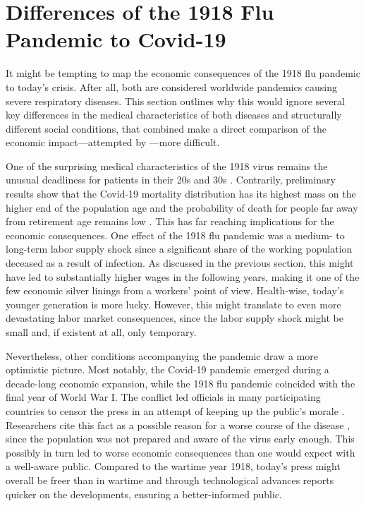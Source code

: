 \documentclass[12pt,a4paper]{article}
\begin{document}
\section{Differences of the 1918 Flu Pandemic to Covid-19}

It might be tempting to map the economic consequences of the 1918 flu pandemic to today's crisis.
After all, both are considered worldwide pandemics causing severe respiratory diseases.
This section outlines why this would ignore several key differences in the medical characteristics of both diseases and structurally different social conditions, that combined make a direct comparison of the economic impact---attempted by \cite{barroCoronavirusGreatInfluenza2020}---more difficult.

One of the surprising medical characteristics of the 1918 virus remains the unusual deadliness for patients in their 20s and 30s \citep{taubenberger1918InfluenzaMother2006}.
Contrarily, preliminary results show that the Covid-19 mortality distribution has its highest mass on the higher end of the population age and the probability of death for people far away from retirement age remains low \citep{weissClinicalCourseMortality2020, zhouClinicalCourseRisk2020}.
This has far reaching implications for the economic consequences.
One effect of the 1918 flu pandemic was a medium- to long-term labor supply shock since a significant share of the working population deceased as a result of infection.
As discussed in the previous section, this might have led to substantially higher wages in the following years, making it one of the few economic silver linings from a workers' point of view.
Health-wise, today's younger generation is more lucky.
However, this might translate to even more devastating labor market consequences, since the labor supply shock might be small and, if existent at all, only temporary.

Nevertheless, other conditions accompanying the pandemic draw a more optimistic picture.
Most notably, the Covid-19 pandemic emerged during a decade-long economic expansion, while the 1918 flu pandemic coincided with the final year of World War I.
The conflict led officials in many participating countries to censor the press in an attempt of keeping up the public's morale \citep{chafeeFreedomSpeechWar1919}.
Researchers cite this fact as a possible reason for a worse course of the disease \citep{madhavModelingModernDay2013}, since the population was not prepared and aware of the virus early enough. This possibly in turn led to worse economic consequences than one would expect with a well-aware public.
Compared to the wartime year 1918, today's press might overall be freer than in wartime and through technological advances reports quicker on the developments, ensuring a better-informed public.
\end{document}
